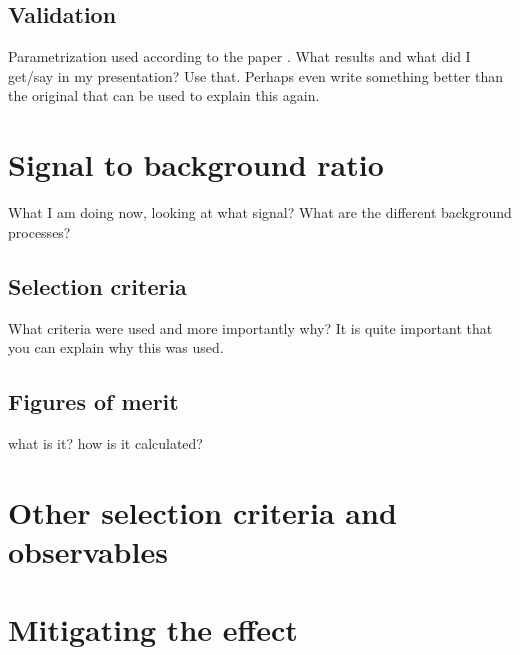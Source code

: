 \subsection{Validation}
Parametrization used according to the paper \citep{ATL-PHYS-PUB-2013-004}. What results and what did I get/say in my presentation? Use that. Perhaps even write something better than the original that can be used to explain this again.

\section{Signal to background ratio}
What I am doing now, looking at what signal? What are the different background processes?
\subsection{Selection criteria}
What criteria were used and more importantly why? It is quite important that you can explain why this was used. 	
\subsection{Figures of merit}
what is it? how is it calculated?
\section{Other selection criteria and observables}
\section{Mitigating the effect}